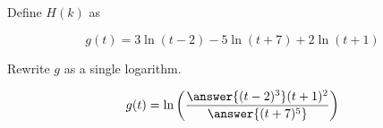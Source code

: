 \documentclass{ximera}
\author{Lee Wayand}
\begin{document}
\begin{exercise}



\begin{question}



Define $H(k)$ as 


\[
g(t) = 3 \ln(t-2) -  5 \ln(t+7) + 2 \ln(t+1)
\]




Rewrite $g$ as a single logarithm.


\[
g(t) = \ln\left(   \frac{\answer{(t-2)^3} (t+1)^2}{\answer{(t+7)^5}}   \right)
\]



\end{question}












\end{exercise}
\end{document}
